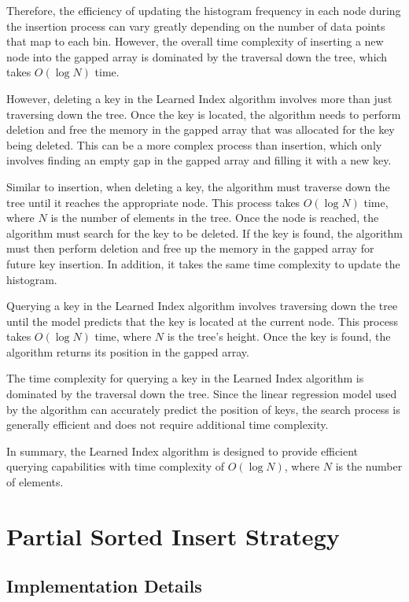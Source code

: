 \documentclass[11pt,a4paper]{article}
\newcommand{\learnindex}{\textsf{Learned Index}\xspace}
\begin{document}
Therefore, the efficiency of updating the histogram frequency in each node during the insertion process can vary greatly depending on the number of data points that map to each bin. However, the overall time complexity of inserting a new node into the gapped array is dominated by the traversal down the tree, which takes $O(\log N)$ time.

However, deleting a key in the \learnindex algorithm involves more than just traversing down the tree. Once the key is located, the algorithm needs to perform deletion and free the memory in the gapped array that was allocated for the key being deleted. This can be a more complex process than insertion, which only involves finding an empty gap in the gapped array and filling it with a new key.

Similar to insertion, when deleting a key, the algorithm must traverse down the tree until it reaches the appropriate node. This process takes $O(\log N)$ time, where $N$ is the number of elements in the tree. Once the node is reached, the algorithm must search for the key to be deleted. If the key is found, the algorithm must then perform deletion and free up the memory in the gapped array for future key insertion. In addition, it takes the same time complexity to update the histogram.

Querying a key in the \learnindex algorithm involves traversing down the tree until the model predicts that the key is located at the current node. This process takes $O(\log N)$ time, where $N$ is the tree's height. Once the key is found, the algorithm returns its position in the gapped array.

The time complexity for querying a key in the \learnindex algorithm is dominated by the traversal down the tree. Since the linear regression model used by the algorithm can accurately predict the position of keys, the search process is generally efficient and does not require additional time complexity.

In summary, the \learnindex algorithm is designed to provide efficient querying capabilities with time complexity of $O(\log N)$, where $N$ is the number of elements. 






\section{Partial Sorted Insert Strategy}
\subsection{Implementation Details}
\end{document}
